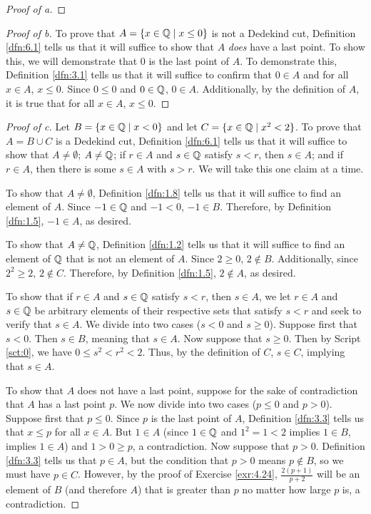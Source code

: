 \documentclass[../main.tex]{subfiles}
\begin{document}
\begin{exercise}
\begin{proof}[Proof of a]
    \end{proof}
    \begin{proof}[Proof of b]
        To prove that $A=\{x\in\mathbb{Q}\mid x\leq 0\}$ is not a Dedekind cut, Definition \ref{dfn:6.1} tells us that it will suffice to show that $A$ \emph{does} have a last point. To show this, we will demonstrate that 0 is the last point of $A$. To demonstrate this, Definition \ref{dfn:3.1} tells us that it will suffice to confirm that $0\in A$ and for all $x\in A$, $x\leq 0$. Since $0\leq 0$ and $0\in\mathbb{Q}$, $0\in A$. Additionally, by the definition of $A$, it is true that for all $x\in A$, $x\leq 0$.
    \end{proof}
    \begin{proof}[Proof of c]
        Let $B=\{x\in\mathbb{Q}\mid x<0\}$ and let $C=\{x\in\mathbb{Q}\mid x^2<2\}$. To prove that $A=B\cup C$ is a Dedekind cut, Definition \ref{dfn:6.1} tells us that it will suffice to show that $A\neq\emptyset$; $A\neq\mathbb{Q}$; if $r\in A$ and $s\in\mathbb{Q}$ satisfy $s<r$, then $s\in A$; and if $r\in A$, then there is some $s\in A$ with $s>r$. We will take this one claim at a time.\par
        To show that $A\neq\emptyset$, Definition \ref{dfn:1.8} tells us that it will suffice to find an element of $A$. Since $-1\in\mathbb{Q}$ and $-1<0$, $-1\in B$. Therefore, by Definition \ref{dfn:1.5}, $-1\in A$, as desired.\par
        To show that $A\neq\mathbb{Q}$, Definition \ref{dfn:1.2} tells us that it will suffice to find an element of $\mathbb{Q}$ that is not an element of $A$. Since $2\geq 0$, $2\notin B$. Additionally, since $2^2\geq 2$, $2\notin C$. Therefore, by Definition \ref{dfn:1.5}, $2\notin A$, as desired.\par
        To show that if $r\in A$ and $s\in\mathbb{Q}$ satisfy $s<r$, then $s\in A$, we let $r\in A$ and $s\in\mathbb{Q}$ be arbitrary elements of their respective sets that satisfy $s<r$ and seek to verify that $s\in A$. We divide into two cases ($s<0$ and $s\geq 0$). Suppose first that $s<0$. Then $s\in B$, meaning that $s\in A$. Now suppose that $s\geq 0$. Then by Script \ref{sct:0}, we have $0\leq s^2<r^2<2$. Thus, by the definition of $C$, $s\in C$, implying that $s\in A$.\par
        To show that $A$ does not have a last point, suppose for the sake of contradiction that $A$ has a last point $p$. We now divide into two cases ($p\leq 0$ and $p>0$). Suppose first that $p\leq 0$. Since $p$ is the last point of $A$, Definition \ref{dfn:3.3} tells us that $x\leq p$ for all $x\in A$. But $1\in A$ (since $1\in\mathbb{Q}$ and $1^2=1<2$ implies $1\in B$, implies $1\in A$) and $1>0\geq p$, a contradiction. Now suppose that $p>0$. Definition \ref{dfn:3.3} tells us that $p\in A$, but the condition that $p>0$ means $p\notin B$, so we must have $p\in C$. However, by the proof of Exercise \ref{exr:4.24}, $\frac{2(p+1)}{p+2}$ will be an element of $B$ (and therefore $A$) that is greater than $p$ no matter how large $p$ is, a contradiction.
    \end{proof}
\end{exercise}
\end{document}

